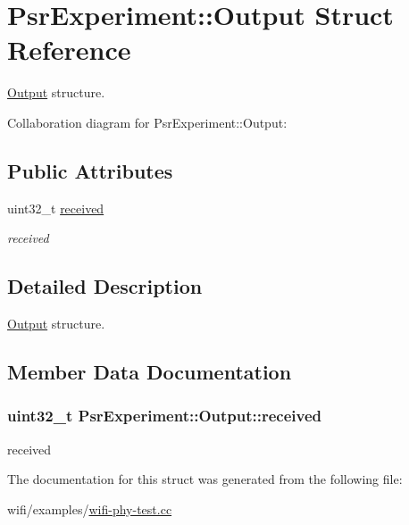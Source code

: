 \hypertarget{structPsrExperiment_1_1Output}{}\section{Psr\+Experiment\+:\+:Output Struct Reference}
\label{structPsrExperiment_1_1Output}


\hyperlink{structPsrExperiment_1_1Output}{Output} structure.  




Collaboration diagram for Psr\+Experiment\+:\+:Output\+:
\subsection*{Public Attributes}
\begin{DoxyCompactItemize}
\item 
uint32\+\_\+t \hyperlink{structPsrExperiment_1_1Output_a51060ffe2dcfb57a68d023b82a16602c}{received}
\begin{DoxyCompactList}\small\item\em received \end{DoxyCompactList}\end{DoxyCompactItemize}


\subsection{Detailed Description}
\hyperlink{structPsrExperiment_1_1Output}{Output} structure. 

\subsection{Member Data Documentation}
\subsubsection[{\texorpdfstring{received}{received}}]{\setlength{\rightskip}{0pt plus 5cm}uint32\+\_\+t Psr\+Experiment\+::\+Output\+::received}\hypertarget{structPsrExperiment_1_1Output_a51060ffe2dcfb57a68d023b82a16602c}{}\label{structPsrExperiment_1_1Output_a51060ffe2dcfb57a68d023b82a16602c}


received 



The documentation for this struct was generated from the following file\+:\begin{DoxyCompactItemize}
\item 
wifi/examples/\hyperlink{wifi-phy-test_8cc}{wifi-\/phy-\/test.\+cc}\end{DoxyCompactItemize}
